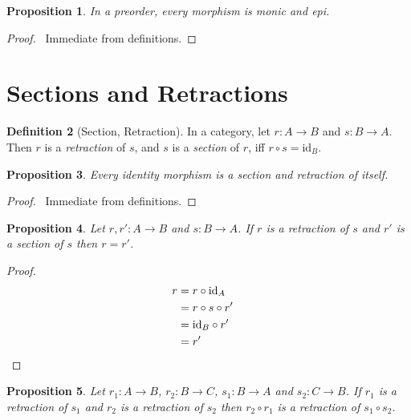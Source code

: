 \documentclass{book}
\let\qed\relax
\newtheorem{prop}{Proposition}[chapter]
\theoremstyle{definition}
\newtheorem{df}[prop]{Definition}
\newcommand{\id}[1]{\ensuremath{\mathrm{id}_{#1}}}
\begin{document}
\begin{prop}
    In a preorder, every morphism is monic and epi.
\end{prop}

\begin{proof}
    \pf\ Immediate from definitions. \qed
\end{proof}

\section{Sections and Retractions}

\begin{df}[Section, Retraction]
    In a category, let $r : A \rightarrow B$ and $s : B \rightarrow A$. Then $r$ is a \emph{retraction} of $s$, and $s$ is a \emph{section} of $r$, iff $r \circ s = \id{B}$.
\end{df}

\begin{prop}
    Every identity morphism is a section and retraction of itself.
\end{prop}

\begin{proof}
    \pf\ Immediate from definitions. \qed
\end{proof}

\begin{prop}
    \label{prop:retraction-is-section}
    Let $r,r' : A \rightarrow B$ and $s : B \rightarrow A$.
    If $r$ is a retraction of $s$ and $r'$ is a section of $s$ then $r = r'$.
\end{prop}

\begin{proof}
    \pf
    \begin{align*}
        r & = r \circ \id{A}            \\
          & = r \circ s \circ r'        \\
          & = \id{B} \circ r'           \\
          & = r'                 & \qed
    \end{align*}
\end{proof}

\begin{prop}
    \label{prop:retraction-comp}
    Let $r_1 : A \rightarrow B$, $r_2 : B \rightarrow C$, $s_1 : B \rightarrow A$ and $s_2 : C \rightarrow B$. If $r_1$ is a retraction of $s_1$ and $r_2$ is a retraction of $s_2$ then $r_2 \circ r_1$ is a retraction of $s_1 \circ s_2$.
\end{prop}
\end{document}

